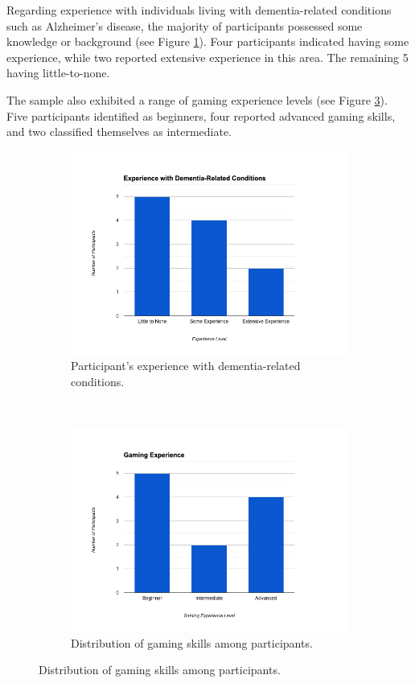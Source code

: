 \documentclass{l4proj}
\begin{document}
Regarding experience with individuals living with dementia-related conditions such as Alzheimer's disease, the majority of participants possessed some knowledge or background (see Figure \ref{fig:dementia_experience}). Four participants indicated having some experience, while two reported extensive experience in this area. The remaining 5 having little-to-none.

The sample also exhibited a range of gaming experience levels (see Figure \ref{fig:gaming_experience}). Five participants identified as beginners, four reported advanced gaming skills, and two classified themselves as intermediate.

\begin{figure}[h]
  \centering

  \begin{subfigure}[t]{0.45\textwidth}
    \includegraphics[width=\textwidth]{dissertation/images/dementia_representation.png}
    \caption{Participant's experience with dementia-related conditions.}
    \label{fig:dementia_experience} 
  \end{subfigure}
  ~
  \begin{subfigure}[t]{0.45\textwidth}
    \includegraphics[width=\textwidth]{dissertation/images/gaming_experience.png}
    \caption{Distribution of gaming skills among participants.}
    \label{fig:gaming_experience} 
  \end{subfigure} 


\end{figure}
\end{document}
